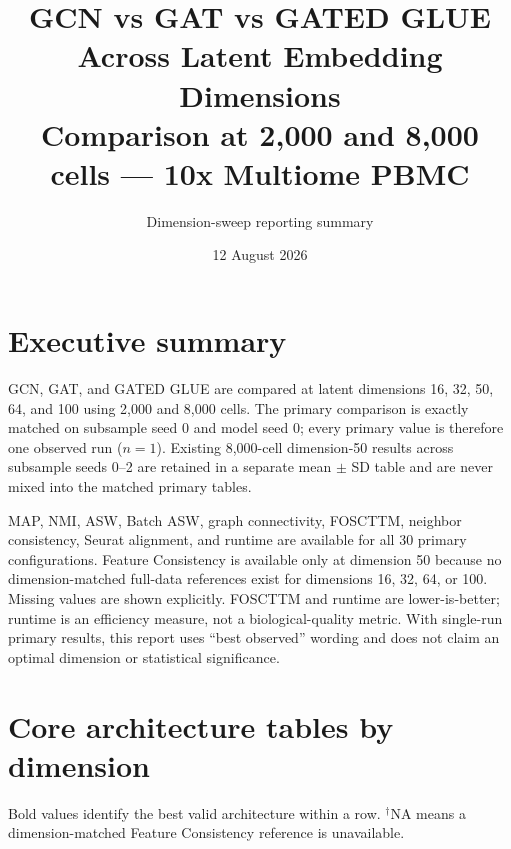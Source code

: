 \documentclass[10pt]{article}
\title{\textbf{GCN vs GAT vs GATED GLUE Across Latent Embedding Dimensions}\\[5pt]
\large Comparison at 2,000 and 8,000 cells --- 10x Multiome PBMC}
\author{Dimension-sweep reporting summary}\date{12 August 2026}
\begin{document}
\maketitle\tableofcontents\newpage
\section{Executive summary}
GCN, GAT, and GATED GLUE are compared at latent dimensions 16, 32, 50, 64, and 100 using 2,000 and 8,000 cells. The primary comparison is exactly matched on subsample seed 0 and model seed 0; every primary value is therefore one observed run ($n=1$). Existing 8,000-cell dimension-50 results across subsample seeds 0--2 are retained in a separate mean $\pm$ SD table and are never mixed into the matched primary tables.

MAP, NMI, ASW, Batch ASW, graph connectivity, FOSCTTM, neighbor consistency, Seurat alignment, and runtime are available for all 30 primary configurations. Feature Consistency is available only at dimension 50 because no dimension-matched full-data references exist for dimensions 16, 32, 64, or 100. Missing values are shown explicitly. FOSCTTM and runtime are lower-is-better; runtime is an efficiency measure, not a biological-quality metric. With single-run primary results, this report uses ``best observed'' wording and does not claim an optimal dimension or statistical significance.

\section{Core architecture tables by dimension}
Bold values identify the best valid architecture within a row. $^{\dagger}$NA means a dimension-matched Feature Consistency reference is unavailable.
\end{document}
